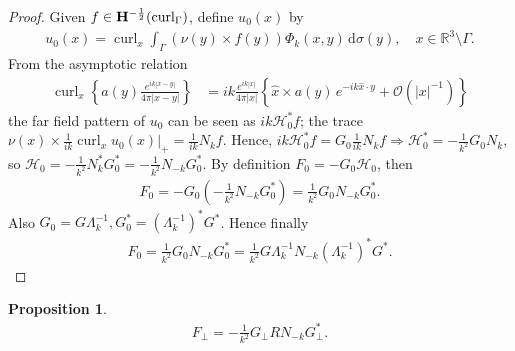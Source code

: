 \documentclass[a4paper,12pt]{article}
\theoremstyle{definition}
\newtheorem{prp}{Proposition}
\newcommand\bdr{\Gamma}
\newcommand\Curl{\curl_\bdr}
\newcommand\Hhm{{\bf H}^{-\frac{1}{2}}}
\newcommand\lTC{\Hhm(\Curl)}
\newcommand\ints[2][y]{\int_{\bdr}#2\,\text{d}\sigma(#1)}
\DeclareMathOperator\curl{curl}
\begin{document}
\begin{proof}
  Given $f\in\lTC$, define $u_0(x)$ by
  \begin{align*}
    u_0(x) = \curl_x\ints{\left(\nu(y)\times f(y)\right)\Phi_k(x,y)},\quad x\in\mathbb{R}^3\setminus\bdr.
  \end{align*}
  From the asymptotic relation
  \begin{align*}
    \curl_x\left\{a(y)\frac{e^{ik|x-y|}}{4\pi|x-y|}\right\} &= ik\frac{e^{ik|x|}}{4\pi|x|}\left\{\hat{x}\times a(y)\,e^{-ik\hat{x}\cdot y} + \mathcal{O}\left(|x|^{-1}\right)\right\} 
  \end{align*}
  the far field pattern of $u_0$ can be seen as $ik\mathcal{H}_0^*f$; the trace $\nu(x)\times\frac{1}{ik}\curl_x u_0(x)|_+ = \frac{1}{ik}N_k f$. Hence, $ik\mathcal{H}_0^*f = G_0 \frac{1}{ik} N_k f\Longrightarrow\mathcal{H}_0^* = -\frac{1}{k^2} G_0 N_k$, so $\mathcal{H}_0 = -\frac{1}{k^2} N_k^* G_0^* = -\frac{1}{k^2}N_{-k}G_0^*$. By definition $F_0=-G_0\mathcal{H}_0$, then 
  \begin{align}
    F_0 = -G_0\left(-\frac{1}{k^2}N_{-k}G_0^*\right) = \frac{1}{k^2}G_0N_{-k}G_0^*.
  \end{align}
  Also $G_0 = G\Lambda_k^{-1}, G_0^* = \left(\Lambda_k^{-1}\right)^*G^*$. Hence finally
  \begin{align}
    F_0 = \frac{1}{k^2}G_0N_{-k}G_0^* = \frac{1}{k^2}G\Lambda_k^{-1}N_{-k}\left(\Lambda_k^{-1}\right)^*G^*.
  \end{align}
\end{proof}


\begin{prp}
  \begin{align*}
    F_\perp = -\frac{1}{k^2}G_\perp R N_{-k} G_\perp^*.
  \end{align*}
\end{prp}
\end{document}
